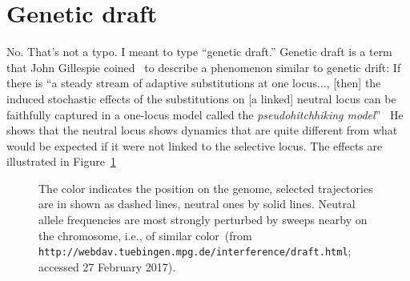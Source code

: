 \section*{Genetic draft}

No. That's not a typo. I meant to type ``genetic draft.'' Genetic
draft is a term that John Gillespie coined~\cite{Gillespie-2000} to
describe a phenomenon similar to genetic drift: If there is ``a steady
stream of adaptive substitutions at one locus$\dots$, [then] the
induced stochastic effects of the substitutions on [a linked] neutral
locus can be faithfully captured in a one-locus model called the {\it
  pseudohitchhiking model}''~\cite[p. 909]{Gillespie-2000} He shows
that the neutral locus shows dynamics that are quite different from
what would be expected if it were not linked to the selective
locus. The effects are illustrated in Figure~\ref{fig:genetic-draft}

\begin{figure}
\begin{center}
\end{center}
\caption{The color indicates the position on the genome, selected
  trajectories are in shown as dashed lines, neutral ones by solid
  lines. Neutral allele frequencies are most strongly perturbed by
  sweeps nearby on the chromosome, i.e., of similar color~(from
  {\tt http://webdav.tuebingen.mpg.de/interference/draft.html};
  accessed 27 February 2017).}\label{fig:genetic-draft}  
\end{figure}

